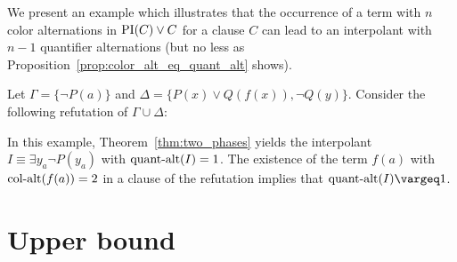 \documentclass[%
	draft=false,%
	numbers=noendperiod,%
	11pt,%
	a4paper,%
	oneside,%
	openany,%
]{memoir}
\begin{document}
We present an example which illustrates that the occurrence of a term with $n$ color alternations in $\PI(C) \lor C$ for a clause $C$ can lead to an interpolant with $n-1$ quantifier alternations (but no less as Proposition~\ref{prop:color_alt_eq_quant_alt} shows).
\begin{exa}
	Let $\Gamma = \{ \lnot P(a) \}$ and $\Delta = \{ P(x) \lor Q(f(x)), \lnot Q(y) \}$.
	Consider the following refutation of $\Gamma \cup \Delta$:
	\begin{prooftree}


	\end{prooftree}

	In this example, Theorem~\ref{thm:two_phases} yields the interpolant $I \equiv \exists y_a \lnot P(y_a)$ with $\qa(I) =\nolinebreak 1$.
	The existence of the term $f(a)$ with $\ca(f(a)) = 2$ in a clause of the refutation implies that $\qa(I) \vargeq 1$.
\end{exa}

\section{Upper bound}
\end{document}
